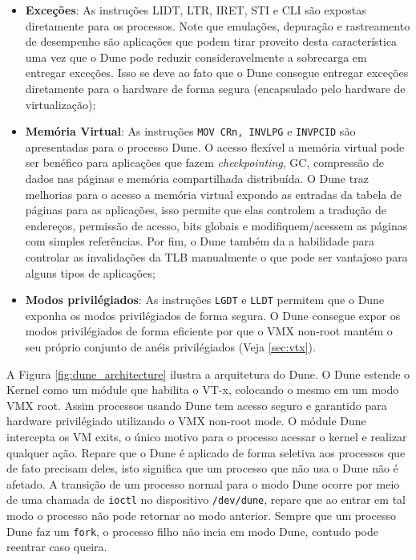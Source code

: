 \begin{itemize}
  \item \textbf{Exceções}:  As instruções LIDT, LTR, IRET, STI e CLI são
        expostas diretamente para os processos. Note que emulações, depuração e
        rastreamento de desempenho são aplicações que podem tirar proveito
        desta característica uma vez que o Dune pode reduzir consideravelmente
        a sobrecarga em entregar exceções. Isso se deve ao fato que o Dune
        consegue entregar exceções diretamente para o hardware de forma segura
        (encapsulado pelo hardware de virtualização);
  \item \textbf{Memória Virtual}: As instruções \texttt{MOV CRn, INVLPG} e
        \texttt{INVPCID} são apresentadas para o processo Dune. O acesso
        flexível a memória virtual pode ser benéfico para aplicações que fazem
        \emph{checkpointing}, GC, compressão de dados nas páginas e memória
        compartilhada distribuída. O Dune traz melhorias para o acesso a
        memória virtual expondo as entradas da tabela de páginas para as
        aplicações, isso permite que elas controlem a tradução de endereços,
        permissão de acesso, bits globais e modifiquem/acessem as páginas com
        simples referências. Por fim, o Dune também da a habilidade para
        controlar as invalidações da TLB manualmente o que pode ser vantajoso
        para alguns tipos de aplicações;
  \item \textbf{Modos privilégiados}: As instruções \texttt{LGDT} e
        \texttt{LLDT} permitem que o Dune exponha os modos privilégiados de
        forma segura. O Dune consegue expor os modos privilégiados de forma
        eficiente por que o VMX non-root mantém o seu próprio conjunto de anéis
        privilégiados (Veja \ref{sec:vtx}).
\end{itemize}

A Figura \ref{fig:dune_architecture} ilustra a arquitetura do Dune. O Dune
estende o Kernel como um módule que habilita o VT-x, colocando o mesmo em um
modo VMX root. Assim processos usando Dune tem acesso seguro e garantido para
hardware privilégiado utilizando o VMX non-root mode. O módule Dune intercepta
os VM exits, o único motivo para o processo acessar o kernel e realizar
qualquer ação. Repare que o Dune é aplicado de forma seletiva aos processos que
de fato precisam deles, isto significa que um processo que não usa o Dune não é
afetado. A transição de um processo normal para o modo Dune ocorre por meio de
uma chamada de \texttt{ioctl} no dispositivo \texttt{/dev/dune}, repare que ao
entrar em tal modo o processo não pode retornar ao modo anterior. Sempre que um
processo Dune faz um \texttt{fork}, o processo filho não incia em modo Dune,
contudo pode reentrar caso queira.


